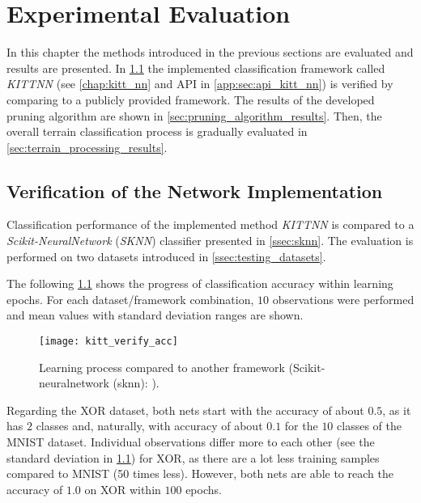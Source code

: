 \chapter{Experimental Evaluation} \label{chap:results}
In this chapter the methods introduced in the previous sections are evaluated and results are presented. In \cref{sec:verification_of_nn} the implemented classification framework called \textit{KITTNN} (see \cref{chap:kitt_nn} and API in \cref{app:sec:api_kitt_nn}) is verified by comparing to a publicly provided framework. The results of the developed pruning algorithm are shown in \cref{sec:pruning_algorithm_results}. Then, the overall terrain classification process is gradually evaluated in \cref{sec:terrain_processing_results}.

\section{Verification of the Network Implementation} \label{sec:verification_of_nn}
Classification performance of the implemented method \textit{KITTNN} is compared to a \textit{Scikit-NeuralNetwork} (\textit{SKNN}) classifier \citep{misc:sknn} presented in \cref{ssec:sknn}. The evaluation is performed on two datasets introduced in \cref{ssec:testing_datasets}.

The following \cref{fig:kitt_verify_acc} shows the progress of classification accuracy within learning epochs. For each dataset/framework combination, $ 10 $ observations were performed and mean values with standard deviation ranges are shown.

\begin{figure}[H]
  \centering
  \texttt{[image: kitt\_verify\_acc]}
  \caption{Learning process compared to another framework (Scikit-neuralnetwork (sknn): \citep{misc:sknn}).}
  \label{fig:kitt_verify_acc}
\end{figure}

Regarding the XOR dataset, both nets start with the accuracy of about $ 0.5 $, as it has $ 2 $ classes and, naturally, with accuracy of about $ 0.1 $ for the $ 10 $ classes of the MNIST dataset. Individual observations differ more to each other (see the standard deviation in \cref{fig:kitt_verify_acc}) for XOR, as there are a lot less training samples compared to MNIST (50 times less). However, both nets are able to reach the accuracy of $ 1.0 $ on XOR within $ 100 $ epochs.


